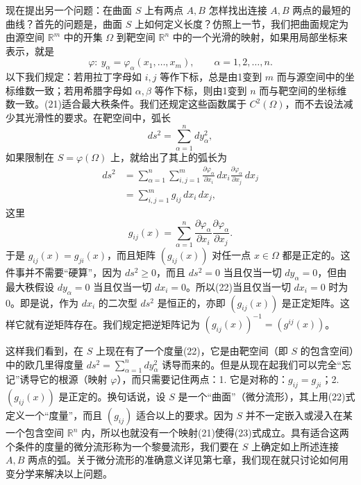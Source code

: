 现在提出另一个问题：在曲面 $S$ 上有两点 $A,B$ 怎样找出连接 $A,B$ 两点的最短的曲线？首先的问题是，曲面 $S$ 上如何定义长度？仿照上一节，我们把曲面规定为由源空间 $\mathbb R^m$ 中的开集 $\Omega$ 到靶空间 $\mathbb R^n$ 中的一个光滑的映射，如果用局部坐标来表示，就是
\begin{equation}
 \varphi:\ y_\alpha=\varphi_\alpha(x_1,\ldots,x_m),
 \qquad \alpha=1,2,\ldots,n.
 \tag{21}
\end{equation}
以下我们规定：若用拉丁字母如 $i,j$ 等作下标，总是由1变到 $m$ 而与源空间中的坐标维数一致；若用希腊字母如 $\alpha,\beta$ 等作下标，则由1变到 $n$ 而与靶空间的坐标维数一致。(21)适合最大秩条件。我们还规定这些函数属于 $C^2(\Omega)$，而不去设法减少其光滑性的要求。在靶空间中，弧长
\[
 ds^2=\sum_{\alpha=1}^{n}dy_\alpha^2,
\]
如果限制在 $S=\varphi(\Omega)$ 上，就给出了其上的弧长为
\begin{align}
 ds^2
 &=\sum_{\alpha=1}^{n}\sum_{i,j=1}^{m}
 \frac{\partial\varphi_\alpha}{\partial x_i}\,dx_i
 \frac{\partial\varphi_\alpha}{\partial x_j}\,dx_j\\
 &=\sum_{i,j=1}^{m}g_{ij}\,dx_i\,dx_j,
 \tag{22}
\end{align}
这里
\begin{equation}
 g_{ij}(x)=\sum_{\alpha=1}^{n}
 \frac{\partial\varphi_\alpha}{\partial x_i}
 \frac{\partial\varphi_\alpha}{\partial x_j}.
 \tag{23}
\end{equation}
于是 $g_{ij}(x)=g_{ji}(x)$，而且矩阵 $(g_{ij}(x))$ 对任一点 $x\in\Omega$ 都是正定的。这件事并不需要“硬算”，因为 $ds^2\ge0$，而且 $ds^2=0$ 当且仅当一切 $dy_\alpha=0$，但由最大秩假设 $dy_\alpha=0$ 当且仅当一切 $dx_i=0$。所以(22)当且仅当一切 $dx_i=0$ 时为0。即是说，作为 $dx_i$ 的二次型 $ds^2$ 是恒正的，亦即 $(g_{ij}(x))$ 是正定矩阵。这样它就有逆矩阵存在。我们规定把逆矩阵记为 $(g_{ij}(x))^{-1}=(g^{ij}(x))$。

这样我们看到，在 $S$ 上现在有了一个度量(22)，它是由靶空间（即 $S$ 的包含空间）中的欧几里得度量 $ds^2=\sum_{\alpha=1}^{n}dy_\alpha^2$ 诱导而来的。但是从现在起我们可以完全“忘记”诱导它的根源（映射 $\varphi$），而只需要记住两点：1. 它是对称的：$g_{ij}=g_{ji}$；2. $(g_{ij}(x))$ 是正定的。换句话说，设 $S$ 是一个“曲面”（微分流形），其上用(22)式定义一个“度量”，而且 $(g_{ij})$ 适合以上的要求。因为 $S$ 并不一定嵌入或浸入在某一个包含空间 $\mathbb R^n$ 内，所以也就没有一个映射(21)使得(23)式成立。具有适合这两个条件的度量的微分流形称为一个黎曼流形，我们要在 $S$ 上确定如上所述连接 $A,B$ 两点的弧。关于微分流形的准确意义详见第七章，我们现在就只讨论如何用变分学来解决以上问题。

